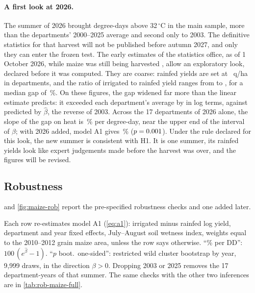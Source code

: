 \paragraph{A first look at 2026.} The summer of 2026 brought \TwentySixHeat{} degree-days above 32\,$^{\circ}$C in the main sample, \TwentySixHeatDev{} more than the departments' 2000--2025 average and second only to 2003. The definitive statistics for that harvest will not be published before autumn 2027, and only they can enter the frozen test. The early estimates of the statistics office, as of 1 October 2026, while maize was still being harvested \parencite{agreste2026conjoncture}, allow an exploratory look, declared before it was computed. They are coarse: rainfed yields are set at \TwentySixRainMin~q/ha in \TwentySixRainMinN{} departments, and the ratio of irrigated to rainfed yield ranges from \TwentySixRatioMin{} to \TwentySixRatioMax{}, for a median gap of \TwentySixGapMed\,\%. On these figures, the gap widened far more than the linear estimate predicts: it exceeded each department's average by \TwentySixGapObs{} in log terms, against \TwentySixGapPred{} predicted by $\hat\beta$, the reverse of 2003. Across the 17 departments of 2026 alone, the slope of the gap on heat is \TwentySixSlopePct\,\% per degree-day, near the upper end of the interval of $\beta$; with 2026 added, model A1 gives \TwentySixAllPct\,\% ($p = 0.001$). Under the rule declared for this look, the new summer is consistent with H1. It is one summer, its rainfed yields look like expert judgements made before the harvest was over, and the figures will be revised.

\subsection{Robustness}

 and \cref{fig:maize-rob} report the pre-specified robustness checks and one added later.

\begin{table}[H]
\centering
\small
\caption{Maize: robustness of the main estimate}
\label{tab:maize-rob}
\begin{threeparttable}

\begin{tablenotes}\footnotesize
\item Each row re-estimates model A1 (\cref{eq:a1}): irrigated minus rainfed log yield, department and year fixed effects, July--August soil wetness index, weights equal to the 2010--2012 grain maize area, unless the row says otherwise. ``\% per DD'': $100\,(e^{\hat\beta}-1)$. ``$p$ boot.\ one-sided'': restricted wild cluster bootstrap by year, 9,999 draws, in the direction $\beta > 0$. Dropping 2003 or 2025 removes the 17 department-years of that summer. The same checks with the other two inferences are in \cref{tab:rob-maize-full}.
\end{tablenotes}
\end{threeparttable}
\end{table}


